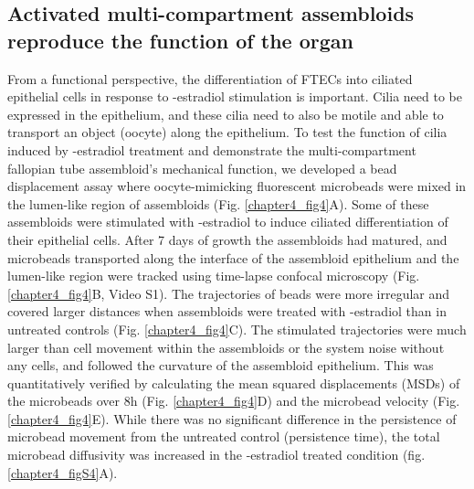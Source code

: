 \begin{refsection}
    
    \subsection{Activated multi-compartment assembloids reproduce the function of the organ}
    From a functional perspective, the differentiation of FTECs into ciliated epithelial cells in response to \textbeta-estradiol stimulation is important. Cilia need to be expressed in the epithelium, and these cilia need to also be motile and able to transport an object (oocyte) along the epithelium\cite{yuan2021a,suarez2021a,wanggren2008a}. To test the function of cilia induced by \textbeta-estradiol treatment and demonstrate the multi-compartment fallopian tube assembloid’s mechanical function, we developed a bead displacement assay where oocyte-mimicking fluorescent microbeads were mixed in the lumen-like region of assembloids (Fig. \ref{chapter4_fig4}A). Some of these assembloids were stimulated with \textbeta-estradiol to induce ciliated differentiation of their epithelial cells. After 7 days of growth the assembloids had matured, and microbeads transported along the interface of the assembloid epithelium and the lumen-like region were tracked using time-lapse confocal microscopy (Fig. \ref{chapter4_fig4}B, Video S1). The trajectories of beads were more irregular and covered larger distances when assembloids were treated with \textbeta-estradiol than in untreated controls (Fig. \ref{chapter4_fig4}C). The stimulated trajectories were much larger than cell movement within the assembloids or the system noise without any cells, and followed the curvature of the assembloid epithelium. This was quantitatively verified by calculating the mean squared displacements (MSDs) of the microbeads over 8h (Fig. \ref{chapter4_fig4}D) and the microbead velocity (Fig. \ref{chapter4_fig4}E)\cite{wirtz2009a,wu2015a}. While there was no significant difference in the persistence of microbead movement from the untreated control (persistence time), the total microbead diffusivity was increased in the \textbeta-estradiol treated condition (fig. \ref{chapter4_figS4}A). 

\end{refsection}
